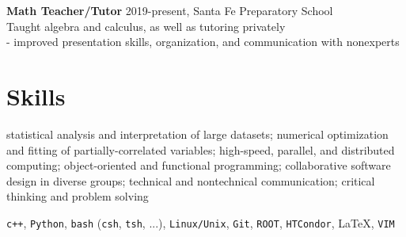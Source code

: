 \documentclass[letterpaper,12pt]{article} %
\begin{document}
 {\large {\bf Math Teacher/Tutor} 2019-present, Santa Fe Preparatory School} \\
 Taught algebra and calculus, as well as tutoring privately \\
- improved presentation skills, organization, and communication with nonexperts 

\section{Skills}
statistical analysis and interpretation of large datasets; numerical optimization and fitting of partially-correlated variables; high-speed, parallel, and distributed computing; object-oriented and functional programming; collaborative software design in diverse groups; technical and nontechnical communication; critical thinking and problem solving

\texttt{c++}, \texttt{Python}, \texttt{bash} (\texttt{csh}, \texttt{tsh}, ...), \texttt{Linux/Unix}, \texttt{Git}, \texttt{ROOT}, \texttt{HTCondor}, \LaTeX, \texttt{VIM}
\end{document}
